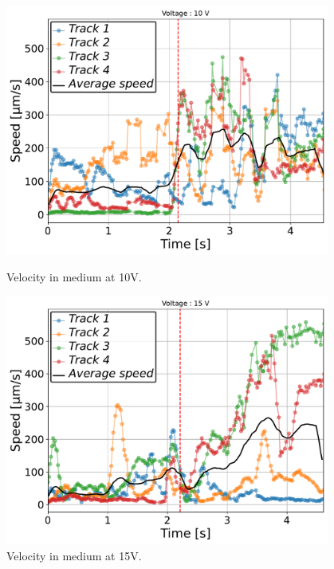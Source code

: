 \begin{figure}[H]
    \centering
    \begin{minipage}[t]{0.49\textwidth}
        \centering
        \includegraphics[width=0.95\textwidth]{Figures/2.5mM_10V_001_velocity_time.pdf}
        \caption{Velocity in  medium at 10V.}
        \label{fig:velocity_time_Ca_10V}
    \end{minipage}
    \hfill
    \begin{minipage}[t]{0.49\textwidth}
        \centering
        \includegraphics[width=0.95\textwidth]{Figures/2.5mM_15V_001_velocity_time.pdf}
        \caption{Velocity in  medium at 15V.}
        \label{fig:velocity_time_Ca_15V}
    \end{minipage}
\end{figure}

